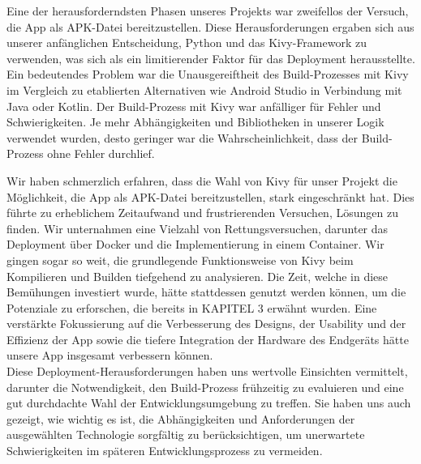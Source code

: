 	Eine der herausforderndsten Phasen unseres Projekts war zweifellos der Versuch, die App als APK-Datei bereitzustellen. Diese Herausforderungen ergaben sich aus unserer anfänglichen Entscheidung, Python und das Kivy-Framework zu verwenden, was sich als ein limitierender Faktor für das Deployment herausstellte. Ein bedeutendes Problem war die Unausgereiftheit des Build-Prozesses mit Kivy im Vergleich zu etablierten Alternativen wie Android Studio in Verbindung mit Java oder Kotlin. Der Build-Prozess mit Kivy war anfälliger für Fehler und Schwierigkeiten. Je mehr Abhängigkeiten und Bibliotheken in unserer Logik verwendet wurden, desto geringer war die Wahrscheinlichkeit, dass der Build-Prozess ohne Fehler durchlief.
	
	Wir haben schmerzlich erfahren, dass die Wahl von Kivy für unser Projekt die Möglichkeit, die App als APK-Datei bereitzustellen, stark eingeschränkt hat. Dies führte zu erheblichem Zeitaufwand und frustrierenden Versuchen, Lösungen zu finden. Wir unternahmen eine Vielzahl von Rettungsversuchen, darunter das Deployment über Docker und die Implementierung in einem Container. Wir gingen sogar so weit, die grundlegende Funktionsweise von Kivy beim Kompilieren und Builden tiefgehend zu analysieren.	Die Zeit, welche in diese Bemühungen investiert wurde, hätte stattdessen genutzt werden können, um die Potenziale zu erforschen, die bereits in KAPITEL 3 erwähnt wurden. Eine verstärkte Fokussierung auf die Verbesserung des Designs, der Usability und der Effizienz der App sowie die tiefere Integration der Hardware des Endgeräts hätte unsere App insgesamt verbessern können.
	\\
	Diese Deployment-Herausforderungen haben uns wertvolle Einsichten vermittelt, darunter die Notwendigkeit, den Build-Prozess frühzeitig zu evaluieren und eine gut durchdachte Wahl der Entwicklungsumgebung zu treffen. Sie haben uns auch gezeigt, wie wichtig es ist, die Abhängigkeiten und Anforderungen der ausgewählten Technologie sorgfältig zu berücksichtigen, um unerwartete Schwierigkeiten im späteren Entwicklungsprozess zu vermeiden.